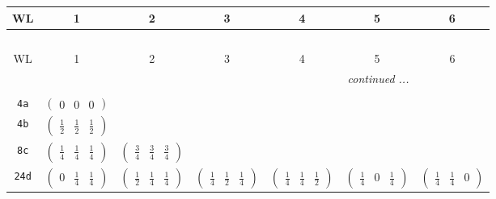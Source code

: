 \documentclass[fleqn,9pt,landscape]{jsarticle}
\begin{document}
\begin{center}
\renewcommand{\arraystretch}{1.2}
\begin{longtable}{ccccccc}
 \hline \hline
WL & 1 & 2 & 3 & 4 & 5 & 6 \\ \hline \endfirsthead

\multicolumn{6}{l}{\tablename\ \thetable{}} \\
 \hline \hline
WL & 1 & 2 & 3 & 4 & 5 & 6 \\ \hline \endhead

 \hline \hline
\multicolumn{6}{r}{\footnotesize\it continued ...} \\ \endfoot

 \hline \hline
\multicolumn{6}{r}{} \\ \endlastfoot

{\tt 4a} & $ \begin{pmatrix} 0 & 0 & 0 \end{pmatrix} $ & $  $ & $  $ & $  $ & $  $ & $  $ \\ \hline
{\tt 4b} & $ \begin{pmatrix} \frac{1}{2} & \frac{1}{2} & \frac{1}{2} \end{pmatrix} $ & $  $ & $  $ & $  $ & $  $ & $  $ \\ \hline
{\tt 8c} & $ \begin{pmatrix} \frac{1}{4} & \frac{1}{4} & \frac{1}{4} \end{pmatrix} $ & $ \begin{pmatrix} \frac{3}{4} & \frac{3}{4} & \frac{3}{4} \end{pmatrix} $ & $  $ & $  $ & $  $ & $  $ \\ \hline
{\tt 24d} & $ \begin{pmatrix} 0 & \frac{1}{4} & \frac{1}{4} \end{pmatrix} $ & $ \begin{pmatrix} \frac{1}{2} & \frac{1}{4} & \frac{1}{4} \end{pmatrix} $ & $ \begin{pmatrix} \frac{1}{4} & \frac{1}{2} & \frac{1}{4} \end{pmatrix} $ & $ \begin{pmatrix} \frac{1}{4} & \frac{1}{4} & \frac{1}{2} \end{pmatrix} $ & $ \begin{pmatrix} \frac{1}{4} & 0 & \frac{1}{4} \end{pmatrix} $ & $ \begin{pmatrix} \frac{1}{4} & \frac{1}{4} & 0 \end{pmatrix} $ \\ \hline

\end{longtable}
\end{center}
\end{document}
